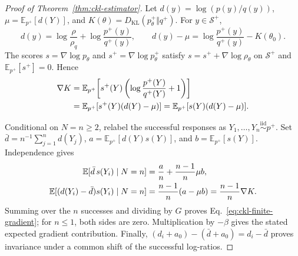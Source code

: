 \begin{proof}[Proof of Theorem~\ref{thm:ckl-estimator}]
Let $d(y)=\log(p(y)/q(y))$, $\mu=\mathbb E_{p^+}[d(Y)]$, and
$K(\theta)=D_{\mathrm{KL}}(p_\theta^+\Vert q^+)$.
For $y\in\mathcal S^+$,
\begin{equation}
 d(y)=\log\frac{\rho}{\rho_q}+\log\frac{p^+(y)}{q^+(y)},
 \qquad
 d(y)-\mu=\log\frac{p^+(y)}{q^+(y)}-K(\theta_0).
 \label{eq:ckl-log-ratio-decomposition}
\end{equation}
The scores $s=\nabla\log p_\theta$ and $s^+=\nabla\log p_\theta^+$ satisfy
$s=s^++\nabla\log\rho_\theta$ on $\mathcal S^+$ and
$\mathbb E_{p^+}[s^+]=0$. Hence
\begin{align}
 \nabla K
 &=\mathbb E_{p^+}\!\left[
 s^+(Y)\left(\log\frac{p^+(Y)}{q^+(Y)}+1\right)\right]\notag\\
 &=\mathbb E_{p^+}[s^+(Y)(d(Y)-\mu)]
  =\mathbb E_{p^+}[s(Y)(d(Y)-\mu)].
 \label{eq:ckl-conditional-gradient}
\end{align}

Conditional on $N=n\ge2$, relabel the successful responses as
$Y_1,\ldots,Y_n\overset{\mathrm{iid}}{\sim}p^+$.
Set $\bar d=n^{-1}\sum_{j=1}^n d(Y_j)$,
$a=\mathbb E_{p^+}[d(Y)s(Y)]$, and $b=\mathbb E_{p^+}[s(Y)]$.
Independence gives
\begin{align}
 \mathbb E[\bar d\,s(Y_i)\mid N=n]
 &=\frac{a}{n}+\frac{n-1}{n}\mu b,\notag\\
 \mathbb E[(d(Y_i)-\bar d)s(Y_i)\mid N=n]
 &=\frac{n-1}{n}(a-\mu b)
  =\frac{n-1}{n}\nabla K.
 \label{eq:ckl-sample-centering-factor}
\end{align}
Summing over the $n$ successes and dividing by $G$ proves
Eq.~\eqref{eq:ckl-finite-gradient}; for $n\le1$, both sides are zero.
Multiplication by $-\beta$ gives the stated expected gradient contribution.
Finally, $(d_i+a_0)-(\bar d+a_0)=d_i-\bar d$ proves invariance
under a common shift of the successful log-ratios.
\end{proof}
